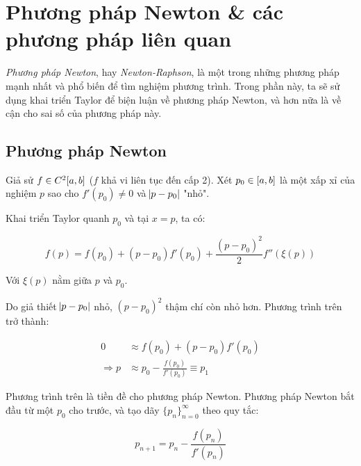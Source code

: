 \documentclass[../../Lectures]{subfiles}
\begin{document}

\section{Phương pháp Newton \& các phương pháp liên quan}

\emph{Phương pháp Newton}, hay \emph{Newton-Raphson}, là một trong những phương
pháp mạnh nhất và phổ biến để tìm nghiệm phương trình. Trong phần này, ta sẽ sử
dụng khai triển Taylor để biện luận về phương pháp Newton, và hơn nữa là về cận
cho sai số của phương pháp này.

\subsection{Phương pháp Newton}\label{sec:newton_method}

Giả sử \(f \in C^2\interval{a}{b}\) (\(f\) khả vi liên tục đến cấp 2). Xét \(p_0
\in \interval{a}{b}\) là một xấp xỉ của nghiệm \(p\) sao cho \(f'(p_0) \neq 0\)
và \(\abs{p - p_0}\) "nhỏ".

Khai triển Taylor quanh \(p_0\) và tại \(x = p\), ta có:

\[f(p) = f(p_0) + (p - p_0) f'(p_0) + \frac{(p - p_0)^2}{2} f''(\xi(p))\]

Với \(\xi(p)\) nằm giữa \(p\) và \(p_0\).

Do giả thiết \(\abs{p - p_0}\) nhỏ, \((p - p_0)^2\) thậm chí còn nhỏ hơn. Phương
trình trên trở thành:

\[\begin{aligned}
                0 & \approx f(p_0) + (p - p_0) f'(p_0) \\
    \Rightarrow	p & \approx p_0 - \frac{f(p_0)}{f'(p_0)} \equiv p_1
\end{aligned}\]

Phương trình trên là tiền đề cho phương pháp Newton. Phương pháp Newton bắt đầu
từ một \(p_0\) cho trước, và tạo dãy \(\{p_n\}_{n = 0}^\infty\) theo quy tắc:

\begin{equation}\label{eq:newton_sequence_function}
    p_{n + 1} = p_n - \frac{f(p_n)}{f'(p_n)}
\end{equation}

\end{document}

